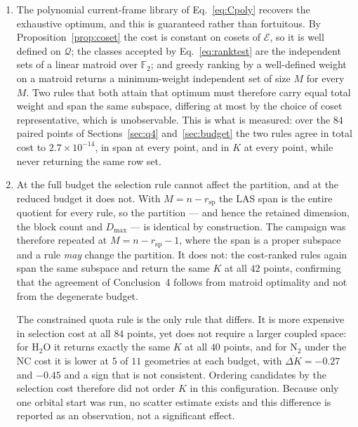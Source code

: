 \documentclass[11pt]{article}
\newcommand{\FF}{\mathbb F_2}
\newcommand{\Ecal}{\mathcal E}
\newcommand{\Qcal}{\mathcal Q}
\newcommand{\Dmax}{D_{\max}}
\newcommand{\rsp}{r_{\mathrm{sp}}}
\begin{document}
\begin{enumerate}[leftmargin=1.8em,itemsep=4pt]
\item The polynomial current-frame library of Eq.~\eqref{eq:Cpoly} recovers the
  exhaustive optimum, and this is guaranteed rather than fortuitous. By
  Proposition~\ref{prop:coset} the cost is constant on cosets of $\Ecal$, so it
  is well defined on $\Qcal$; the classes accepted by Eq.~\eqref{eq:ranktest}
  are the independent sets of a linear matroid over $\FF$; and greedy ranking
  by a well-defined weight on a matroid returns a minimum-weight independent
  set of size $M$ for every $M$. Two rules that both attain that optimum must
  therefore carry equal total weight and span the same subspace, differing at
  most by the choice of coset representative, which is unobservable. This is
  what is measured: over the $84$ paired points of
  Sections~\ref{sec:q4} and~\ref{sec:budget} the two rules agree in total cost
  to $2.7\times10^{-14}$, in span at every point, and in $K$ at every point,
  while never returning the same row set.

\item At the full budget the selection rule cannot affect the partition, and at
  the reduced budget it does not. With $M=n-\rsp$ the LAS span is the entire
  quotient for every rule, so the partition --- and hence the retained
  dimension, the block count and $\Dmax$ --- is identical by construction. The
  campaign was therefore repeated at $M=n-\rsp-1$, where the span is a proper
  subspace and a rule \emph{may} change the partition. It does not: the
  cost-ranked rules again span the same subspace and return the same $K$ at all
  $42$ points, confirming that the agreement of Conclusion~4 follows from
  matroid optimality and not from the degenerate budget.

  The constrained quota rule is the only rule that differs. It is more
  expensive in selection cost at all $84$ points, yet does not require a larger
  coupled space: for $\mathrm{H_2O}$ it returns exactly the same $K$ at all
  $40$ points, and for $\mathrm{N_2}$ under the NC cost it is lower at $5$ of
  $11$ geometries at each budget, with $\overline{\Delta K}=-0.27$ and $-0.45$
  and a sign that is not consistent. Ordering candidates by the selection cost
  therefore did not order $K$ in this configuration. Because only one orbital
  start was run, no scatter estimate exists and this difference is reported as
  an observation, not a significant effect.

\end{enumerate}
\end{document}
